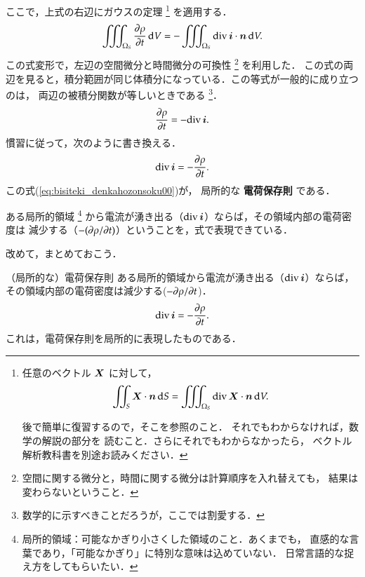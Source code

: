         ここで，上式の右辺にガウスの定理
            \footnote{
                任意のベクトル $\boldsymbol{X}$ に対して，
                \begin{equation*}
                      \int\mspace{-11mu}\int_{S} \boldsymbol{X} \cdot \boldsymbol{n} \,\mathrm{d} S
                    = \int\mspace{-11mu}\int\mspace{-11mu}\int_{\Omega_{S}} \mathrm{div}\, \boldsymbol{X} \cdot \boldsymbol{n} \,\mathrm{d} V.
                \end{equation*}

                後で簡単に復習するので，そこを参照のこと．
                それでもわからなければ，数学の解説の部分を
                読むこと．さらにそれでもわからなかったら，
                ベクトル解析教科書を別途お読みください．
            }
        を適用する．
            \begin{equation*}
                  \vint_{\Omega_{S}} \frac{\rd \rho}{\rd t} \df V
                = - \vint_{\Omega_{S}} \ddiv \bi \cdot \bn \df V.
            \end{equation*}
        この式変形で，左辺の空間微分と時間微分の可換性
            \footnote{
                空間に関する微分と，時間に関する微分は計算順序を入れ替えても，
                結果は変わらないということ．
            }
        を利用した．
        この式の両辺を見ると，積分範囲が同じ体積分になっている．この等式が一般的に成り立つのは，
        両辺の被積分関数が等しいときである
            \footnote{
                数学的に示すべきことだろうが，ここでは割愛する．
            }．
            \begin{equation*}
                  \frac{\partial \rho}{\partial t} = -\mathrm{div}\, \boldsymbol{i}.
            \end{equation*}
        慣習に従って，次のように書き換える．
            \begin{align}\label{eq:bisiteki_denkahozonsoku00}
                \ddiv \bi = -\frac{\rd \rho}{\rd t}.
            \end{align}
        この式(\ref{eq:bisiteki_denkahozonsoku00})が，
        局所的な \textbf{電荷保存則} である．

        ある局所的領域
            \footnote{
                局所的領域：可能なかぎり小さくした領域のこと．あくまでも，
                直感的な言葉であり，「可能なかぎり」に特別な意味は込めていない．
                日常言語的な捉え方をしてもらいたい．
            }
        から電流が湧き出る（$\mathrm{div}\, \boldsymbol{i}$）ならば，その領域内部の電荷密度は
        減少する（$-(\partial \rho/\partial t)$）ということを，式で表現できている．

        改めて，まとめておこう．
            \begin{myshadebox}{（局所的な）電荷保存則}
                ある局所的領域から電流が湧き出る（$\mathrm{div}\, \boldsymbol{i}$）ならば，
                その領域内部の電荷密度は減少する($-\partial \rho/\partial t$)．
                \begin{align}
                    \mathrm{div}\, \boldsymbol{i} = -\frac{\partial \rho}{\partial t}.
                \end{align}
                これは，電荷保存則を局所的に表現したものである．
            \end{myshadebox}

